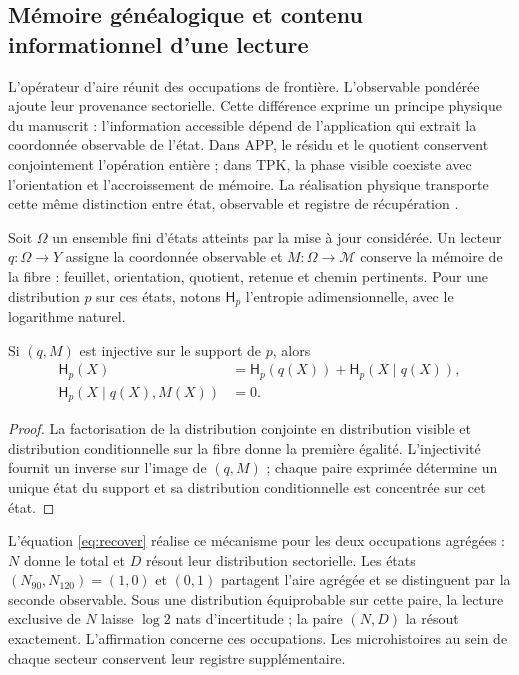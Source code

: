 \subsection{Mémoire généalogique et contenu informationnel d'une lecture}
\label{sec:ii-memoria-lectura}

L’opérateur d’aire réunit des occupations de frontière. L’observable
pondérée ajoute leur provenance sectorielle. Cette différence exprime un
principe physique du manuscrit : l’information accessible dépend de
l’application qui extrait la coordonnée observable de l’état. Dans APP, le résidu et le quotient
conservent conjointement l’opération entière ; dans TPK, la phase visible
coexiste avec l’orientation et l’accroissement de mémoire. La réalisation
physique transporte cette même distinction entre état, observable et
registre de récupération \cite{informacion}.

Soit \(\Omega\) un ensemble fini d’états atteints par la
mise à jour considérée. Un lecteur \(q:\Omega\to Y\) assigne la
coordonnée observable et \(M:\Omega\to\mathcal M\) conserve la mémoire
de la fibre : feuillet, orientation, quotient, retenue et chemin pertinents.
Pour une distribution \(p\) sur ces états, notons
\(\mathsf H_p\) l’entropie adimensionnelle, avec le logarithme naturel.

\begin{proposition}
Si \((q,M)\) est injective sur le support de \(p\), alors
\begin{align}
 \mathsf H_p(X)&=\mathsf H_p(q(X))+
                 \mathsf H_p(X\mid q(X)),\\
 \mathsf H_p(X\mid q(X),M(X))&=0.
 \label{eq:ii-memoria-condicional}
\end{align}
\end{proposition}
\begin{proof}
La factorisation de la distribution conjointe en distribution visible
et distribution conditionnelle sur la fibre donne la première égalité.
L’injectivité fournit un inverse sur l’image de \((q,M)\) ;
chaque paire exprimée détermine un unique état du support et sa
distribution conditionnelle est concentrée sur cet état.
\end{proof}

L’équation \eqref{eq:recover} réalise ce mécanisme pour les deux
occupations agrégées : \(N\) donne le total et \(D\) résout leur
distribution sectorielle. Les états \((N_{90},N_{120})=(1,0)\) et
\((0,1)\) partagent l’aire agrégée et se distinguent par la seconde
observable. Sous une distribution équiprobable sur cette paire, la
lecture exclusive de \(N\) laisse \(\log2\) nats d’incertitude ;
la paire \((N,D)\) la résout exactement. L’affirmation concerne
ces occupations. Les microhistoires au sein de chaque secteur conservent
leur registre supplémentaire.

